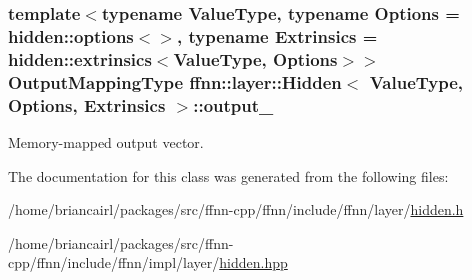\hypertarget{classffnn_1_1layer_1_1_hidden_a118c5ecea99dc243573c981f26d53fc6}{
\subsubsection[{output\-\_\-}]{\setlength{\rightskip}{0pt plus 5cm}template$<$typename Value\-Type, typename Options = hidden\-::options$<$$>$, typename Extrinsics = hidden\-::extrinsics$<$\-Value\-Type, Options$>$$>$ {\bf Output\-Mapping\-Type} {\bf ffnn\-::layer\-::\-Hidden}$<$ Value\-Type, Options, Extrinsics $>$\-::output\-\_\-\hspace{0.3cm}{\ttfamily [protected]}}}\label{classffnn_1_1layer_1_1_hidden_a118c5ecea99dc243573c981f26d53fc6}


Memory-\/mapped output vector. 



The documentation for this class was generated from the following files\-:\begin{DoxyCompactItemize}
\item 
/home/briancairl/packages/src/ffnn-\/cpp/ffnn/include/ffnn/layer/\hyperlink{hidden_8h}{hidden.\-h}\item 
/home/briancairl/packages/src/ffnn-\/cpp/ffnn/include/ffnn/impl/layer/\hyperlink{hidden_8hpp}{hidden.\-hpp}\end{DoxyCompactItemize}
